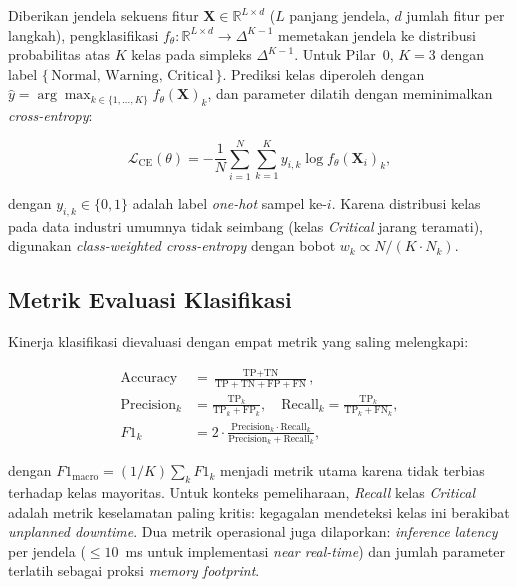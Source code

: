 Diberikan jendela sekuens fitur $\mathbf{X} \in \mathbb{R}^{L \times d}$
($L$ panjang jendela, $d$ jumlah fitur per langkah), pengklasifikasi
$f_\theta : \mathbb{R}^{L \times d} \to \Delta^{K-1}$ memetakan jendela
ke distribusi probabilitas atas $K$ kelas pada simpleks
$\Delta^{K-1}$. Untuk Pilar~0, $K = 3$ dengan label
$\{\,\text{Normal},\, \text{Warning},\, \text{Critical}\,\}$. Prediksi
kelas diperoleh dengan
$\hat{y} = \arg\max_{k \in \{1,\ldots,K\}} f_\theta(\mathbf{X})_k$, dan
parameter dilatih dengan meminimalkan \emph{cross-entropy}:

\begin{equation}\label{eq:bab3_xentropy}
  \mathcal{L}_{\text{CE}}(\theta) = -\frac{1}{N} \sum_{i=1}^{N}
    \sum_{k=1}^{K} y_{i,k} \log f_\theta(\mathbf{X}_i)_k,
\end{equation}

\noindent dengan $y_{i,k} \in \{0,1\}$ adalah label \emph{one-hot} sampel
ke-$i$. Karena distribusi kelas pada data industri umumnya tidak
seimbang (kelas \emph{Critical} jarang teramati), digunakan
\emph{class-weighted cross-entropy} dengan bobot
$w_k \propto N / (K \cdot N_k)$.

\subsection{Metrik Evaluasi Klasifikasi}
\label{subsec:bab3_kls_metrik}

Kinerja klasifikasi dievaluasi dengan empat metrik yang saling melengkapi:

\begin{equation}\label{eq:bab3_kls_metrik}
  \begin{aligned}
    \text{Accuracy} &= \frac{\text{TP} + \text{TN}}{\text{TP} + \text{TN} + \text{FP} + \text{FN}}, \\
    \text{Precision}_k &= \frac{\text{TP}_k}{\text{TP}_k + \text{FP}_k},\quad
    \text{Recall}_k = \frac{\text{TP}_k}{\text{TP}_k + \text{FN}_k}, \\
    F1_k &= 2 \cdot \frac{\text{Precision}_k \cdot \text{Recall}_k}{\text{Precision}_k + \text{Recall}_k},
  \end{aligned}
\end{equation}

\noindent dengan $F1_{\text{macro}} = (1/K)\sum_k F1_k$ menjadi metrik
utama karena tidak terbias terhadap kelas mayoritas. Untuk konteks
pemeliharaan, \emph{Recall} kelas \emph{Critical} adalah metrik
keselamatan paling kritis: kegagalan mendeteksi kelas ini berakibat
\emph{unplanned downtime}. Dua metrik operasional juga dilaporkan:
\emph{inference latency} per jendela ($\leq 10$~ms untuk implementasi
\emph{near real-time}) dan jumlah parameter terlatih sebagai proksi
\emph{memory footprint}.

